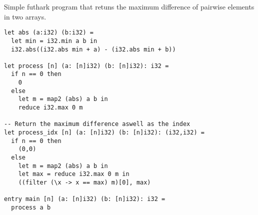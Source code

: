 \documentclass{article}
\begin{document}
Simple futhark program that retuns the maximum difference of pairwise elements
in two arrays.
\begin{lstlisting}
let abs (a:i32) (b:i32) =
  let min = i32.min a b in
  i32.abs((i32.abs min + a) - (i32.abs min + b))

let process [n] (a: [n]i32) (b: [n]i32): i32 =
  if n == 0 then
    0
  else
    let m = map2 (abs) a b in
    reduce i32.max 0 m

-- Return the maximum difference aswell as the index
let process_idx [n] (a: [n]i32) (b: [n]i32): (i32,i32) =
  if n == 0 then
    (0,0)
  else
    let m = map2 (abs) a b in
    let max = reduce i32.max 0 m in
    ((filter (\x -> x == max) m)[0], max)

entry main [n] (a: [n]i32) (b: [n]i32): i32 =
  process a b
\end{lstlisting}
\end{document}
